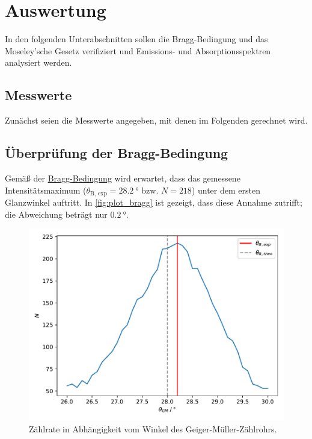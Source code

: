 \section{Auswertung}

In den folgenden Unterabschnitten sollen
die Bragg-Bedingung und das Moseley'sche Gesetz verifiziert und
Emissions- und Absorptionsspektren analysiert werden.

\subsection{Messwerte}

Zunächst seien die Messwerte angegeben,
mit denen im Folgenden gerechnet wird.



\subsection{Überprüfung der Bragg-Bedingung}
\label{sec:auswertung:bragg}

Gemäß der \hyperref[eqn:BraggBedingung]{Bragg-Bedingung} wird erwartet,
dass das gemessene Intensitätsmaximum
($\theta_\text{B, exp} = \SI{28.2}{\degree}$ bzw. $N = \num{218}$)
unter dem ersten Glanzwinkel auftritt.
In \autoref{fig:plot_bragg} ist gezeigt,
dass diese Annahme zutrifft;
die Abweichung beträgt nur $\SI{0.2}{\degree}$.

\begin{figure}
    \centering
    \includegraphics[width=\textwidth]{build/plot_bragg.pdf}
    \caption{Zählrate in Abhängigkeit vom Winkel des Geiger-Müller-Zählrohrs.}
    \label{fig:plot_bragg}
\end{figure}


